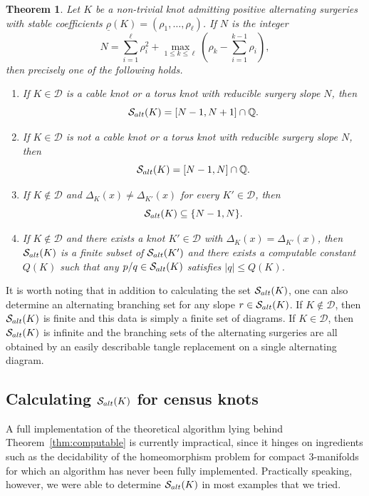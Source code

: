 \documentclass{amsart} %
\newcommand{\D}{\mathcal{D}}
\newcommand{\Q}{\mathbb{Q}}
\newcommand{\Salt}{\mathcal{S}_{\rm alt}}
\theoremstyle{thm}
\newtheorem{thm}[Theorem]{Theorem}
\theoremstyle{definition}
\numberwithin{equation}{section}
\begin{document}
\newcommand{\salttrichotomy}{Let $K$ be a non-trivial knot admitting positive alternating surgeries with stable coefficients $\underline{\rho}(K)=(\rho_1, \dots, \rho_\ell)$. If $N$ is the integer
\begin{equation*}
    N=\sum_{i=1}^\ell \rho_i^2 + \max_{1\leq k \leq \ell} \left(\rho_k - \sum_{i=1}^{k-1} \rho_i \right),
\end{equation*}
then precisely one of the following holds.
\begin{enumerate}
    \item\label{it:KinDcable} If $K\in \D$ is a cable knot or a torus knot with reducible surgery slope $N$, then
    \[\Salt(K)= [N-1, N+1]\cap \Q.\]
    \item\label{it:KinDnoncable} If $K\in \D$ is not a cable knot or a torus knot with reducible surgery slope $N$, then
    \[\Salt(K)= [N-1, N]\cap \Q.\] 
    \item\label{it:KnotinDgeneral} If $K\notin \D$ and $\Delta_K(x)\neq \Delta_{K'}(x)$ for every $K'\in \D$, then 
    \[\Salt(K)\subseteq\{N-1,N\}.\]
    \item\label{it:KnotinDAlexpolyinD} If $K\notin \D$ and there exists a knot $K'\in \D$ with $\Delta_K(x)=\Delta_{K'}(x)$, then $\Salt(K)$ is a finite subset of $\Salt(K')$ and there exists a computable constant $Q(K)$ such that any $p/q\in \Salt(K)$ satisfies $|q|\leq Q(K)$.
\end{enumerate}}

\begin{thm}\label{thm:salt_trichotomy}
\salttrichotomy
\end{thm}
It is worth noting that in addition to calculating the set $\Salt(K)$, one can also determine an alternating branching set for any slope $r\in \Salt(K)$. If $K\not\in \D$, then $\Salt(K)$ is finite and this data is simply a finite set of diagrams. If $K\in\D$, then $\Salt(K)$ is infinite and the branching sets of the alternating surgeries are all obtained by an easily describable tangle replacement on a single alternating diagram.

\subsection{Calculating \texorpdfstring{$\Salt(K)$}{Salt(K)} for census knots}
A full implementation of the theoretical algorithm lying behind Theorem~\ref{thm:computable} is currently impractical, since it hinges on ingredients such as the decidability of the homeomorphism problem for compact 3-manifolds for which an algorithm has never been fully implemented. Practically speaking, however, we were able to determine $\Salt(K)$ in most examples that we tried. 
\end{document}
